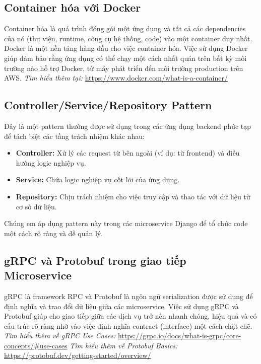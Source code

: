 \subsection{Container hóa với Docker}
Container hóa là quá trình đóng gói một ứng dụng và tất cả các dependencies của nó (thư viện, runtime, công cụ hệ thống, code) vào một container duy nhất. Docker là một nền tảng hàng đầu cho việc container hóa. Việc sử dụng Docker giúp đảm bảo rằng ứng dụng có thể chạy một cách nhất quán trên bất kỳ môi trường nào hỗ trợ Docker, từ máy phát triển đến môi trường production trên AWS.
\textit{Tìm hiểu thêm tại:} \url{https://www.docker.com/what-is-a-container/}

\subsection{Controller/Service/Repository Pattern}
Đây là một pattern thường được sử dụng trong các ứng dụng backend phức tạp để tách biệt các tầng trách nhiệm khác nhau:
\begin{itemize}
    \item \textbf{Controller:} Xử lý các request từ bên ngoài (ví dụ: từ frontend) và điều hướng logic nghiệp vụ.
    \item \textbf{Service:} Chứa logic nghiệp vụ cốt lõi của ứng dụng.
    \item \textbf{Repository:} Chịu trách nhiệm cho việc truy cập và thao tác với dữ liệu từ cơ sở dữ liệu.
\end{itemize}
Chúng em áp dụng pattern này trong các microservice Django để tổ chức code một cách rõ ràng và dễ quản lý.
\begin{comment}
\textit{Tìm hiểu thêm (ví dụ về pattern tương tự trong Java Spring):} \url{https://www.baeldung.com/spring-data-jpa-tutorial} (Bạn có thể tìm kiếm các tài liệu tương tự cho Python/Django)
\end{comment}

\subsection{gRPC và Protobuf trong giao tiếp Microservice}
gRPC là framework RPC và Protobuf là ngôn ngữ serialization được sử dụng để định nghĩa và trao đổi dữ liệu giữa các microservice. Việc sử dụng gRPC và Protobuf giúp cho giao tiếp giữa các dịch vụ trở nên nhanh chóng, hiệu quả và có cấu trúc rõ ràng nhờ vào việc định nghĩa contract (interface) một cách chặt chẽ.
\textit{Tìm hiểu thêm về gRPC Use Cases:} \url{https://grpc.io/docs/what-is-grpc/core-concepts/#use-cases}
\textit{Tìm hiểu thêm về Protobuf Basics:} \url{https://protobuf.dev/getting-started/overview/}
